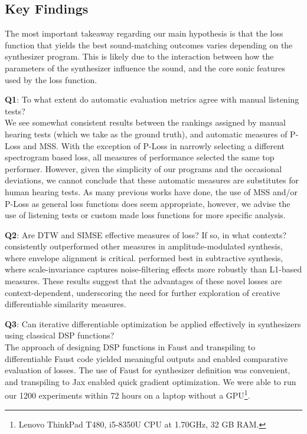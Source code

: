 
\subsection{Key Findings}
The most important takeaway regarding our main hypothesis is that the loss function that yields the best sound-matching outcomes varies depending on the synthesizer program. This is likely due to the interaction between how the parameters of the synthesizer influence the sound, and the core sonic features used by the loss function.

\textbf{Q1}: To what extent do automatic evaluation metrics agree with manual listening tests? 
\\We see somewhat consistent results between the rankings assigned by manual hearing tests (which we take as the ground truth), and automatic measures of P-Loss and MSS. With the exception of P-Loss in \BPNoise{} narrowly selecting a different spectrogram based loss, all measures of performance selected the same top performer. However, given the simplicity of our programs and the occasional deviations, we cannot conclude that these automatic measures are substitutes for human hearing tests. As many previous works have done, the use of MSS and/or P-Loss as general loss functions does seem appropriate, however, we advise the use of listening tests or custom made loss functions for more specific analysis. 

\textbf{Q2}: Are DTW and SIMSE effective measures of loss? If so, in what contexts?\\
\DTWEnv{} consistently outperformed other measures in amplitude-modulated synthesis, where envelope alignment is critical. \SIMSESpec{} performed best in subtractive synthesis, where scale-invariance captures noise-filtering effects more robustly than L1-based measures. These results suggest that the advantages of these novel losses are context-dependent, underscoring the need for further exploration of creative differentiable similarity measures. 


\textbf{Q3}: Can iterative differentiable optimization be applied effectively in synthesizers using classical DSP functions? \\
The approach of designing DSP functions in Faust and transpiling to differentiable Faust code yielded meaningful outputs and enabled comparative evaluation of losses. The use of Faust for synthesizer definition was convenient, and transpiling to Jax enabled quick gradient optimization. We were able to run our 1200 experiments within 72 hours on a laptop without a GPU\footnote{Lenovo ThinkPad T480, i5-8350U CPU at 1.70GHz, 32 GB RAM.}.

